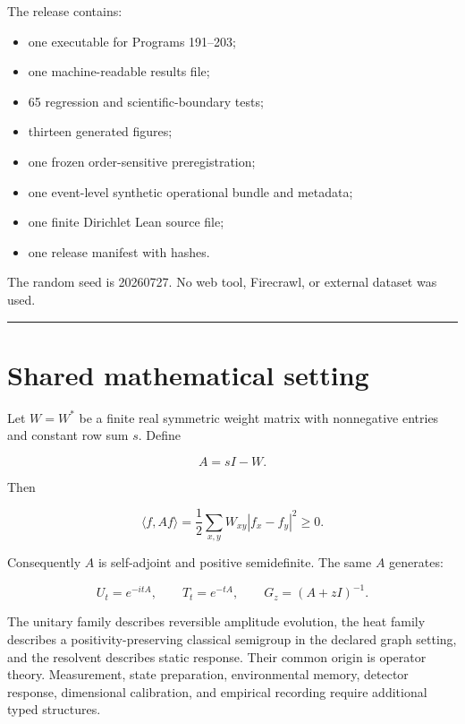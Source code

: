 \documentclass[11pt,a4paper,openany]{report}
\begin{document}
The release contains:

\begin{itemize}
\item 
one executable for Programs 191--203;

\item 
one machine-readable results file;

\item 
65 regression and scientific-boundary tests;

\item 
thirteen generated figures;

\item 
one frozen order-sensitive preregistration;

\item 
one event-level synthetic operational bundle and metadata;

\item 
one finite Dirichlet Lean source file;

\item 
one release manifest with hashes.

\end{itemize}

The random seed is 20260727. No web tool, Firecrawl, or external dataset was used.

\par\medskip\hrule\medskip

\chapter{Shared mathematical setting}

Let \(W=W^\ast\) be a finite real symmetric weight matrix with nonnegative entries and constant row sum \(s\). Define

\[
A=sI-W.
\]

Then

\[
\langle f,Af\rangle
=
\frac12\sum_{x,y}W_{xy}|f_x-f_y|^2
\ge0.
\]

Consequently \(A\) is self-adjoint and positive semidefinite. The same \(A\) generates:

\[
U_t=e^{-itA},
\qquad
T_t=e^{-tA},
\qquad
G_z=(A+zI)^{-1}.
\]

The unitary family describes reversible amplitude evolution, the heat family describes a positivity-preserving classical semigroup in the declared graph setting, and the resolvent describes static response. Their common origin is operator theory. Measurement, state preparation, environmental memory, detector response, dimensional calibration, and empirical recording require additional typed structures.
\end{document}
